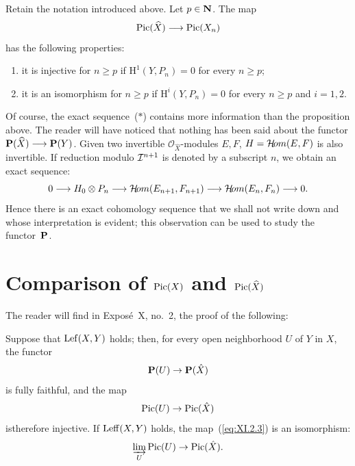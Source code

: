 \begin{proposition}\label{XI.1.1}
Retain the notation introduced above. Let $p\in\mathbf N$. The map
\[
  \operatorname{Pic}(\widehat X)\longrightarrow\operatorname{Pic}(X_n)
\]
has the following properties:


\begin{enumerate}
\renewcommand{\labelenumi}{(\roman{enumi})}
\item it is injective for $n\geq p$ if $\mathrm H^1(Y,P_n)=0$ for every
$n\geq p$;
\item it is an isomorphism for $n\geq p$ if $\mathrm H^i(Y,P_n)=0$ for
every $n\geq p$ and $i=1,2$.
\end{enumerate}
\end{proposition}

Of course, the exact sequence~\textup{($\ast$)} contains more
information than the proposition above. The reader will have noticed that
nothing has been said about the functor
$\mathbf P(\widehat X)\longrightarrow\mathbf P(Y)$. Given two invertible
$\mathcal O_{\widehat X}$-modules $E,F$,
$H=\mathcal H\!om(E,F)$ is also invertible. If reduction modulo
$\mathcal I^{n+1}$ is denoted by a subscript $n$, we obtain an exact sequence:
\[
0\longrightarrow H_0\otimes P_n
\longrightarrow \mathcal H\!om(E_{n+1},F_{n+1})
\longrightarrow \mathcal H\!om(E_n,F_n)
\longrightarrow 0.
\]
Hence there is an exact cohomology sequence that we shall not write down and
whose interpretation is evident; this observation can be used to study the
functor~$\mathbf P$.

\section{Comparison of $\operatorname{Pic}(X)$ and $\operatorname{Pic}(\widehat X)$}\label{XI.2}

The reader will find in Expos\'e~X, no.~2, the proof of the following:






\begin{proposition} \label{XI.2.1} Suppose that $\operatorname{Lef}(X, Y)$ holds; then, for every open neighborhood $U$ of $Y$ in $X$, the functor
\begin{equation} \label{eq:XI.2.1} \mathbf P(U)\to\mathbf P(\hat X)
\end{equation}
is fully faithful, and the map
\begin{equation} \label{eq:XI.2.2} \operatorname{Pic}(U)\to\operatorname{Pic}(\hat X)
\end{equation}
is\pageoriginale therefore injective. If $\operatorname{Leff}(X, Y)$ holds, the map~(\ref{eq:XI.2.3}) is an isomorphism:
\begin{equation} \label{eq:XI.2.3}
\varinjlim_U\operatorname{Pic}(U)\to\operatorname{Pic}(\hat X){}.
\end{equation}
\end{proposition}

